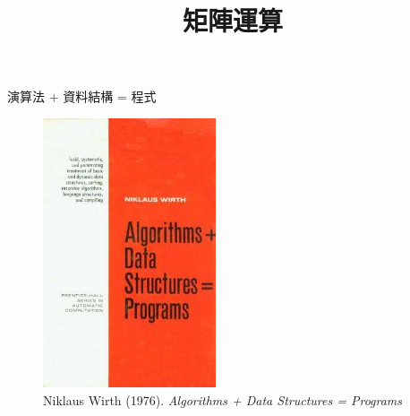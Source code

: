 \documentclass{Amo}
\begin{document}
\title{矩陣運算}
\maketitle

\begin{frame}{演算法 + 資料結構 = 程式}
    \begin{figure}
        \includegraphics[height=0.5\textheight]{MatrixComputations/Algorithms_+_Data_Structures.jpg}
        \caption{Niklaus Wirth (1976).  \textit{Algorithms + Data Structures = Programs}}
    \end{figure}
\end{frame}
\end{document}
